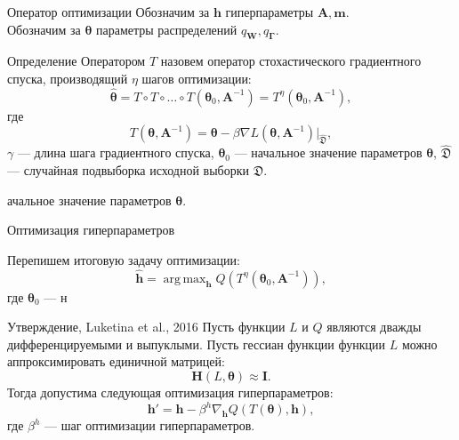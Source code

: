 \documentclass[usenames,dvipsnames,11pt,pdf,utf8,russian,aspectratio=169]{beamer}
\DeclareMathOperator*{\argmax}{arg\,max}
\begin{document}
\begin{frame}{Оператор оптимизации}
Обозначим за $\mathbf{h}$ гиперпараметры $\mathbf{A}, \mathbf{m}$.\\
Обозначим за $\boldsymbol{\theta}$ параметры распределений $q_{\mathbf{W}}, q_{\boldsymbol{\Gamma}}$.

\begin{block}{Определение}
Оператором $T$ назовем оператор стохастического градиентного спуска, производящий $\eta$ шагов оптимизации:
\begin{equation}
\label{eq:gd}
	 \hat{\boldsymbol{\theta}} = T \circ T \circ \dots \circ T(\boldsymbol{\theta}_0, \mathbf{A}^{-1}) = T^\eta(\boldsymbol{\theta}_0, \mathbf{A}^{-1}),
\end{equation}
где 
$$
	T(\boldsymbol{\theta}, \mathbf{A}^{-1}) =\boldsymbol{\theta} - \beta \nabla L(\boldsymbol{\theta}, \mathbf{A}^{-1})|_{\hat{\mathfrak{D}}}, 
$$
$\gamma$ --- длина шага градиентного спуска, $\boldsymbol{\theta}_0$ --- начальное значение параметров $\boldsymbol{\theta}$, $\hat{\mathfrak{D}}$ --- случайная подвыборка исходной выборки $\mathfrak{D}$.
\end{block}

ачальное значение параметров $\boldsymbol{\theta}$.


\end{frame}

\begin{frame}{Оптимизация гиперпараметров}

Перепишем итоговую задачу оптимизации:
\[
	\hat{\mathbf{h}} = \argmax_{\mathbf{h}} Q( T^\eta(\boldsymbol{\theta}_0, \mathbf{A}^{-1})),
\]
где $\boldsymbol{\theta}_0$ --- н
\begin{block}{Утверждение, Luketina et al., 2016}
Пусть функции $L$ и $Q$ являются дважды дифференцируемыми и выпуклыми. 
Пусть гессиан функции функции $L$ можно аппроксимировать единичной матрицей:
\[
    \mathbf{H}(L, \boldsymbol{\theta}) \approx \mathbf{I}.
\]
Тогда допустима следующая оптимизация гиперпараметров:
\[
    \mathbf{h}' = \mathbf{h} - \beta^{h} \nabla_{\mathbf{h}} Q(T(\boldsymbol{\theta}), \mathbf{h}),
\]
где $\beta^{h}$ --- шаг оптимизации гиперпараметров.
\end{block}
\end{frame}
\end{document}
